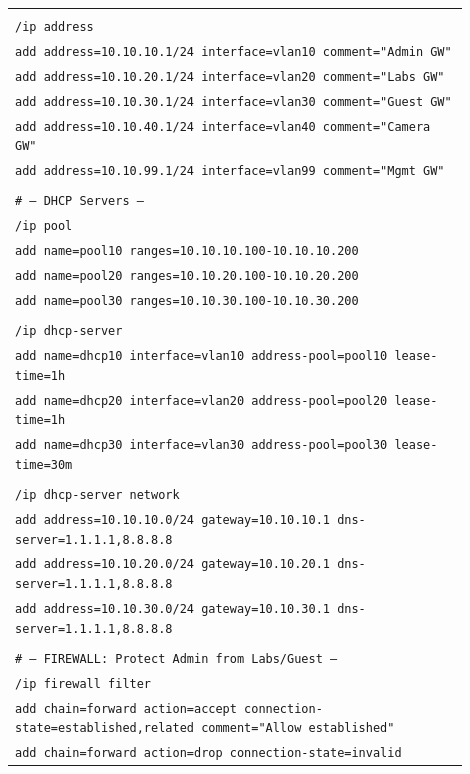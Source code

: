 \documentclass[11pt]{article}
\begin{document}
\begin{exoresolu}
\begin{center}
\begin{tabular}{|p{0.9\linewidth}|}
\texttt{}\\
\texttt{/ip address}\\
\texttt{add address=10.10.10.1/24 interface=vlan10 comment="Admin GW"}\\
\texttt{add address=10.10.20.1/24 interface=vlan20 comment="Labs GW"}\\
\texttt{add address=10.10.30.1/24 interface=vlan30 comment="Guest GW"}\\
\texttt{add address=10.10.40.1/24 interface=vlan40 comment="Camera GW"}\\
\texttt{add address=10.10.99.1/24 interface=vlan99 comment="Mgmt GW"}\\
\texttt{}\\
\texttt{\# --- DHCP Servers ---}\\
\texttt{/ip pool}\\
\texttt{add name=pool10 ranges=10.10.10.100-10.10.10.200}\\
\texttt{add name=pool20 ranges=10.10.20.100-10.10.20.200}\\
\texttt{add name=pool30 ranges=10.10.30.100-10.10.30.200}\\
\texttt{}\\
\texttt{/ip dhcp-server}\\
\texttt{add name=dhcp10 interface=vlan10 address-pool=pool10 lease-time=1h}\\
\texttt{add name=dhcp20 interface=vlan20 address-pool=pool20 lease-time=1h}\\
\texttt{add name=dhcp30 interface=vlan30 address-pool=pool30 lease-time=30m}\\
\texttt{}\\
\texttt{/ip dhcp-server network}\\
\texttt{add address=10.10.10.0/24 gateway=10.10.10.1 dns-server=1.1.1.1,8.8.8.8}\\
\texttt{add address=10.10.20.0/24 gateway=10.10.20.1 dns-server=1.1.1.1,8.8.8.8}\\
\texttt{add address=10.10.30.0/24 gateway=10.10.30.1 dns-server=1.1.1.1,8.8.8.8}\\
\texttt{}\\
\texttt{\# --- FIREWALL: Protect Admin from Labs/Guest ---}\\
\texttt{/ip firewall filter}\\
\texttt{add chain=forward action=accept connection-state=established,related comment="Allow established"}\\
\texttt{add chain=forward action=drop connection-state=invalid}\\

\end{tabular}
\end{center}
\end{exoresolu}
\end{document}
